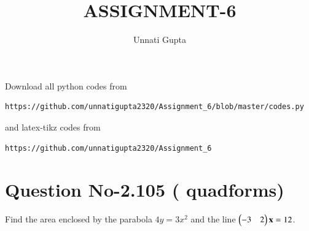 \documentclass[journal,12pt,twocolumn]{IEEEtran}
\begin{document}
     \def\centbox#1{\makebox[0in]{#1}}
     \def\topbox#1{\raisebox{-\baselineskip}[0in][0in]{#1}}
     \def\midbox#1{\raisebox{-0.5\baselineskip}[0in][0in]{#1}}
\vspace{3cm}
\title{ASSIGNMENT-6}
\author{Unnati Gupta}
\maketitle
\newpage
\bigskip
\renewcommand{\thefigure}{\theenumi}
\renewcommand{\thetable}{\theenumi}
Download all python codes from 
\begin{lstlisting}
https://github.com/unnatigupta2320/Assignment_6/blob/master/codes.py
\end{lstlisting}
%
and latex-tikz codes from 
%
\begin{lstlisting}
https://github.com/unnatigupta2320/Assignment_6
\end{lstlisting}
%
\section{Question No-2.105 ( quadforms)}
Find the area enclosed by the parabola $4y=3x^2$ and the line $\begin{pmatrix}-3&2\end{pmatrix}\mathbf{x}=12$.
%
\end{document}
